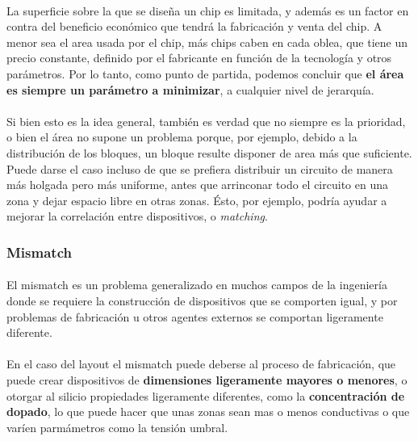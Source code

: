 \paragraph{}
La superficie sobre la que se diseña un chip es limitada, y además es
un factor en contra del beneficio económico que tendrá la fabricación y venta del
chip. A menor sea el area usada por el chip, más chips caben en cada oblea, que tiene
un precio constante, definido por el fabricante en función de la tecnología y otros
parámetros. Por lo tanto, como punto de partida, podemos concluir que \textbf{el área
es siempre un parámetro a minimizar}, a cualquier nivel de jerarquía.

\paragraph{}
Si bien esto es la idea general, también es verdad que no siempre es
la prioridad, o bien el área no supone un problema porque, por ejemplo, debido a la
distribución de los bloques, un bloque resulte disponer de area más que suficiente.
Puede darse el caso incluso de que se prefiera distribuir un circuito de manera más
holgada pero más uniforme, antes que arrinconar todo el circuito en una zona y dejar
espacio libre en otras zonas. Ésto, por ejemplo, podría ayudar a mejorar la correlación
entre dispositivos, o \textit{matching}.

\subsubsection{Mismatch}

\paragraph{}
El mismatch es un problema generalizado en muchos campos de
la ingeniería donde se requiere la construcción de dispositivos que se comporten
igual, y por problemas de fabricación u otros agentes externos se comportan ligeramente
diferente.

\paragraph{}
En el caso del layout el mismatch puede deberse al proceso de fabricación,
que puede crear dispositivos de \textbf{dimensiones ligeramente mayores o menores},
o otorgar al silicio propiedades ligeramente diferentes, como la \textbf{concentración de
dopado}, lo que puede hacer que unas zonas sean mas o menos conductivas o que varíen
parmámetros como la tensión umbral.

